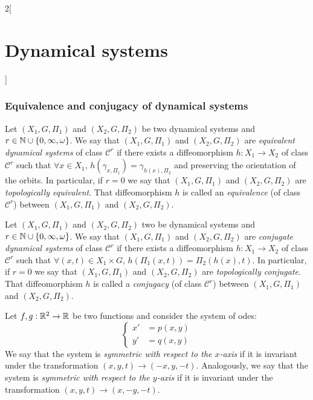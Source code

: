 \documentclass[../../../main_math.tex]{subfiles}
\begin{document}
\begin{multicols}{2}[\section{Dynamical systems}]
  \subsubsection{Equivalence and conjugacy of dynamical systems}
  \begin{definition}
    Let $(X_1,G,\Pi_1)$ and $(X_2,G,\Pi_2)$ be two dynamical systems and $r\in\mathbb{N}\cup\{0,\infty,\omega\}$. We say that $(X_1,G,\Pi_1)$ and $(X_2,G,\Pi_2)$ are \emph{equivalent dynamical systems} of class $\mathcal{C}^r$ if there exists a diffeomorphism $h:X_1\rightarrow X_2$ of class $\mathcal{C}^r$ such that $\forall x\in X_1$, $h(\gamma_{x,\Pi_1})=\gamma_{h(x),\Pi_2}$ and preserving the orientation of the orbits. In particular, if $r=0$ we say that $(X_1,G,\Pi_1)$ and $(X_2,G,\Pi_2)$ are \emph{topologically equivalent}. That diffeomorphism $h$ is called an \emph{equivalence} (of class $\mathcal{C}^r$) between $(X_1,G,\Pi_1)$ and $(X_2,G,\Pi_2)$.
  \end{definition}
  \begin{definition}
    Let $(X_1,G,\Pi_1)$ and $(X_2,G,\Pi_2)$ two be dynamical systems and $r\in\mathbb{N}\cup\{0,\infty,\omega\}$. We say that $(X_1,G,\Pi_1)$ and $(X_2,G,\Pi_2)$ are \emph{conjugate dynamical systems} of class $\mathcal{C}^r$ if there exists a diffeomorphism $h:X_1\rightarrow X_2$ of class $\mathcal{C}^r$ such that $\forall (x,t)\in X_1\times G$, $h(\Pi_1(x,t))=\Pi_2(h(x),t)$. In particular, if $r=0$ we say that $(X_1,G,\Pi_1)$ and $(X_2,G,\Pi_2)$ are \emph{topologically conjugate}. That diffeomorphism $h$ is called a \emph{conjugacy} (of class $\mathcal{C}^r$) between $(X_1,G,\Pi_1)$ and $(X_2,G,\Pi_2)$.
  \end{definition}
  \begin{definition}
    Let $f,g:\mathbb{R}^2\rightarrow\mathbb{R}$ be two functions and consider the system of odes:
    \begin{equation}\label{DS_plane}
      \left\{
      \begin{aligned}
        x' & =p(x,y) \\
        y' & =q(x,y)
      \end{aligned}
      \right.
    \end{equation}
    We say that the system is \emph{symmetric with respect to the $x$-axis} if it is invariant under the transformation $(x,y,t)\rightarrow(-x,y,-t)$. Analogously, we say that the system is \emph{symmetric with respect to the $y$-axis} if it is invariant under the transformation $(x,y,t)\rightarrow(x,-y,-t)$.
  \end{definition}

\end{multicols}
\end{document}
